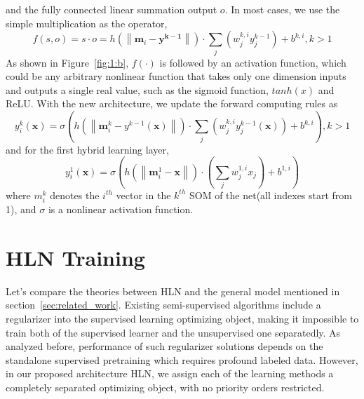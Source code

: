 \documentclass[3p,times,procedia]{elsarticle}
\begin{document}
and the fully connected linear summation 
output $o$. In most cases, we use the
simple multiplication as the operator,
\begin{equation}
	f(s,o) = s\cdot o = 
	h\left(
	\left\|
	\mathbf{m}_i-\mathbf{y^{k-1}}
	\right\|
	\right)
	\cdot
	\sum_j
	\left(
	w_j^{k,i}y_j^{k-1}
	\right)
	+b^{k,i},k>1
	\label{eq:14}
\end{equation}
As shown in Figure~\ref{fig:1:b}, 
$f(\cdot) $ is followed 
by an activation function, which could 
be any 
arbitrary nonlinear function that 
takes 
only one dimension inputs and 
outputs a 
single real value, 
such as the sigmoid function, 
$tanh(x)$ and ReLU. 
With the new 
architecture, 
we update the forward computing
rules as 
\begin{equation}
	y_i^k(\mathbf{x})=
	\sigma\left(
	h\left(
	\left\|
	\mathbf{m}_i^k-y^{k-1}(\mathbf{x})
	\right\|
	\right)\cdot
	\sum_j\left(
	w_j^{k,i}y_j^{k-1}(\mathbf{x})
	\right) + b^{k,i}
	\right), k>1
	\label{eq:15}
\end{equation}
and for the first hybrid learning layer,  
\begin{equation}
	y_i^1(\mathbf{x})=
	\sigma\left(
	h\left(
	\left\|
	\mathbf{m}_i^1-\mathbf{x}
	\right\|
	\right)\cdot
	\left(
	\sum_j w_j^{1,i}x_j
	\right) + b^{1,i}
	\right)
	\label{eq:16}
\end{equation}
where $m^k_i$ denotes the $i^{th}$ 
vector in the $k^{th}$ SOM of 
the net(all indexes start from 1), 
and $\sigma$ is a nonlinear 
activation function.

\section{HLN Training}
Let's compare the theories between
HLN and the general model mentioned 
in section~\ref{sec:related_work}.
Existing semi-supervised algorithms
include a regularizer into the supervised
learning optimizing object, making it 
impossible to train both of
the supervised learner and the 
unsupervised one
separatedly. As analyzed before, 
performance
of such regularizer solutions depends 
on the
standalone supervised pretraining 
which requires profound labeled data.
However, in our proposed architecture 
HLN, we assign
each of the learning methods a 
completely
separated optimizing object, with no 
priority
orders restricted.
\end{document}
